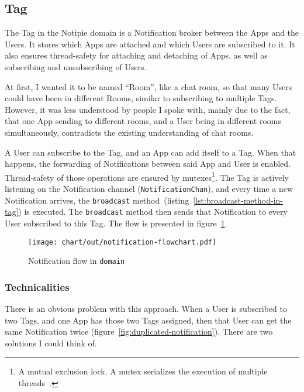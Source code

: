 \subsection{Tag}\label{sec:tag}

The Tag in the Notipie domain
is a Notification broker
between the Apps and the Users.
It stores which Apps are attached
and which Users are subscribed to it.
It also ensures thread-safety
for attaching and detaching of Apps,
as well as subscribing and unsubscribing of Users.

At first,
I wanted it to be named ``Room'',
like a chat room,
so that many Users could have been
in different Rooms,
similar to subscribing to multiple Tags.
However,
it was less understood by people I spoke with,
mainly due to the fact,
that one App sending to different rooms,
and a User being in different rooms simultaneously,
contradicts the existing understanding of chat rooms.

A User can subscribe to the Tag,
and an App can add itself to a Tag.
When that happens,
the forwarding of Notifications
between said App and User is enabled.
Thread-safety of those operations
are ensured by mutexes\footnote{
  A mutual exclusion lock.
  A mutex serializes the execution
  of multiple threads~\cite{mattson_patterns_2004}.
}.
The Tag is actively listening
on the Notification channel (\texttt{NotificationChan}),
and every time a new Notification arrives,
the \texttt{broadcast} method~(listing~\ref{lst:broadcast-method-in-tag})
is executed.
The \texttt{broadcast} method then sends that Notification
to every User subscribed to this Tag.
The flow is presented in figure~\ref{fig:notification-flowchart}.

\begin{figure}[h]
  \centering
  \texttt{[image: chart/out/notification-flowchart.pdf]}
  \caption{Notification flow in \texttt{domain}}
  \label{fig:notification-flowchart}
\end{figure}

\subsubsection{Technicalities}\label{sec:tag-technicalities}

There is an obvious problem with this approach.
When a User is subscribed to two Tags,
and one App has those two Tags assigned,
then that User can get the same Notification twice
(figure~\ref{fig:duplicated-notification}).
There are two solutions I could think of.

